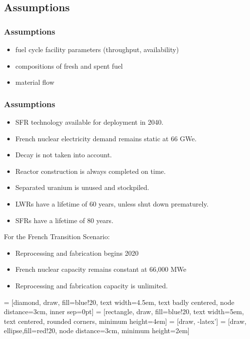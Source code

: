 \subsection{Assumptions}

\begin{frame}
	\frametitle{Assumptions}
	\begin{itemize}
		\item fuel cycle facility parameters (throughput, availability)
		\item compositions of fresh and spent fuel
		\item material flow
	\end{itemize}
\end{frame}

\begin{frame}
	\frametitle{Assumptions}
	\begin{itemize}
		\item SFR technology available for deployment in 2040.
		\item French nuclear electricity demand remains static at 66 GWe.
		\item Decay is not taken into account.
		\item Reactor construction is always completed on time.
		\item Separated uranium is unused and stockpiled.
		\item LWRs have a lifetime of 60 years, unless shut down prematurely.
		\item SFRs have a lifetime of 80 years.
	\end{itemize}
	For the French Transition Scenario:
	\begin{itemize}
		\item Reprocessing and fabrication begins 2020
		\item French nuclear capacity remains constant at 66,000 MWe
		\item Reprocessing and fabrication capacity is unlimited.
	\end{itemize}
\end{frame}


 = [diamond, draw, fill=blue!20, 
text width=4.5em, text badly centered, node distance=3cm, inner sep=0pt]
 = [rectangle, draw, fill=blue!20, 
text width=5em, text centered, rounded corners, minimum height=4em]
 = [draw, -latex']
 = [draw, ellipse,fill=red!20, node distance=3cm,
minimum height=2em]

